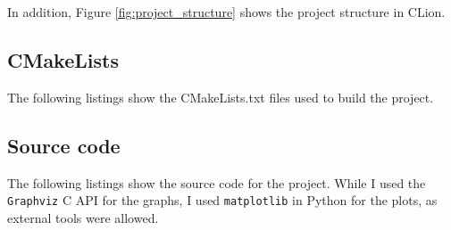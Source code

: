 In addition, Figure \ref{fig:project_structure} shows the project structure in CLion.

\subsection{CMakeLists}
The following listings show the CMakeLists.txt files used to build the project.









\subsection{Source code}
The following listings show the source code for the project.
While I used the \texttt{Graphviz} C API for the graphs, I used \texttt{matplotlib} in Python for the plots, as external tools were allowed.
















